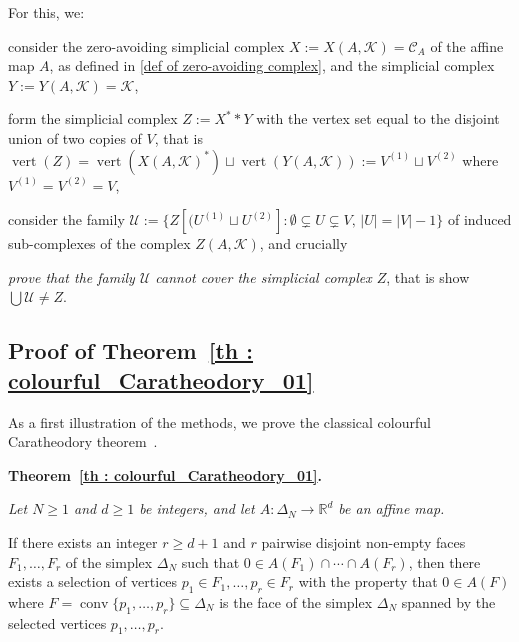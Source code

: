 \documentclass[a4paper,11pt,reqno, english]{amsart}
\theoremstyle{definition}
\theoremstyle{remark}
\newcommand\R{\mathbb R}
\newcommand\U{\mathscr U}
\newcommand\CC{\mathscr C}
\DeclareMathOperator{\vertex}{\mathrm{vert}}
\DeclareMathOperator{\conv}{\mathrm{conv}}
\begin{document}
\medskip
For this, we:
\begin{compactitem}[\rm \quad --]
	\item consider  the zero-avoiding simplicial complex $X:=X(A,\mathcal{K})=\CC_A$ of the affine map $A$, as defined in \eqref{def of zero-avoiding complex}, and the simplicial complex $Y:=Y(A,\mathcal{K})=\mathcal{K}$,
	\item form the simplicial complex $Z:=X^**Y$ with the vertex set equal to the disjoint union of two copies of $V$, that is $\vertex(Z)=\vertex(X(A,\mathcal{K})^*) \sqcup \vertex (Y(A,\mathcal{K})):= V^{(1)}\sqcup  V^{(2)}$ where $V^{(1)}=V^{(2)}=V$,
	\item consider the family $\U :=  \{ Z[(U^{(1)}\sqcup  U^{(2)}]: \emptyset\subsetneq U \subsetneq V,\, |U|=|V|-1\}$
	of induced sub-complexes of the complex $Z(A,\mathcal{K})$, and crucially
	\item \textit{prove that the family $\U$ cannot cover the simplicial complex $Z$},
	that is show  $\bigcup\U\neq  Z$.
\end{compactitem}



\subsection{Proof of Theorem~\ref{th : colourful_Caratheodory_01}}
\label{subsec : colourful Caratheodory's theorem 01}
\medskip


As a first illustration of the methods, we prove the classical colourful Caratheodory theorem~\cite[Thm.\,2.1]{Barany1981}.


\medskip\noindent
{\bf Theorem~\ref{th : colourful_Caratheodory_01}.}
{\em
	Let $N\geq 1$ and $d\geq 1$ be integers, and let $A\colon \Delta_N\longrightarrow\R^d$ be an affine map.

	\smallskip\noindent
	If there exists an integer $r\geq d+1$ and $r$ pairwise disjoint non-empty faces $F_1,\dots, F_{r}$ of the simplex $\Delta_N$ such that
	$
		0\in A(F_1)\cap\cdots\cap A(F_r)
	$,
	then there exists a selection of vertices $p_1\in F_1,\dots, p_r\in F_r$ with the property that $0\in A(F)$ where $F=\conv\{p_1,\dots,p_r\}\subseteq\Delta_N$ is the face of the simplex $\Delta_N$ spanned by the selected vertices  $p_1,\dots,p_r$.
}
\end{document}
